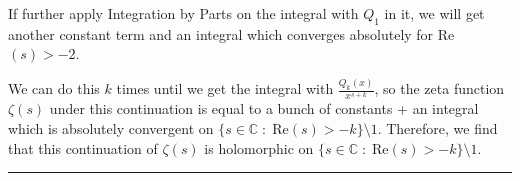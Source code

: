 \documentclass{article}
\newcommand{\C}{\mathbb{C}}
\begin{document}
\vskip 0.5cm
If further apply Integration by Parts on the integral with $Q_1$ in it, we will get another constant term and an integral which converges absolutely for Re$(s) > -2$.

\vskip 0.5cm
We can do this $k$ times until we get the integral with $\frac{Q_k(x)}{x^{s+k}}$, so the zeta function $\zeta(s)$ under this continuation is equal to a bunch of constants + an integral which is absolutely convergent on $\{s \in \C \;:\; \text{Re}(s) > -k \} \setminus {1}$. Therefore, we find that this continuation of $\zeta(s)$ is holomorphic on $\{s \in \C \;:\; \text{Re}(s) > -k \} \setminus {1}$.

\vskip 0.5cm
\hrule 
\vskip 0.5cm









\end{document}
